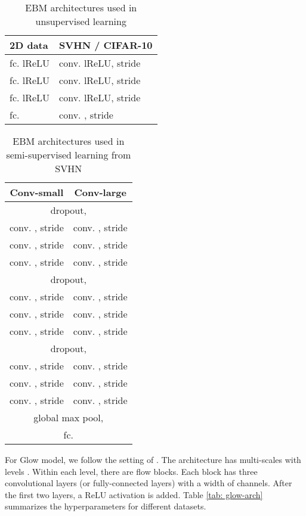 \documentclass[10pt,twocolumn,letterpaper]{article}
\begin{document}
\begin{table}[h]
	\centering
	\caption{EBM architectures used in unsupervised learning}
	\label{tab: ebm-arch}
	\begin{tabular}{ll}
		\toprule
		2D data & SVHN / CIFAR-10  \\
		\midrule 
		fc.  lReLU &  conv.  lReLU, stride   \\
		fc.  lReLU &  conv.  lReLU, stride \\
		fc.  lReLU &  conv.  lReLU, stride \\
		fc.  &  conv. , stride  \\
		\bottomrule
	\end{tabular}
\end{table}

\begin{table}[h]
	\centering
	\caption{EBM architectures used in semi-supervised learning from SVHN}
	\label{tab: ebm-semi-arch}
	\begin{tabular}{cc}
		\toprule
		Conv-small & Conv-large  \\
		\midrule 
		\multicolumn{2}{c}{dropout, }\\
		\midrule
		 conv. , stride  &  conv. , stride   \\
		 conv. , stride  &  conv. , stride   \\
		 conv. , stride  &  conv. , stride   \\
		\midrule
		\multicolumn{2}{c}{dropout, }\\
		\midrule
		 conv. , stride  &  conv. , stride   \\
		 conv. , stride  &  conv. , stride   \\
		 conv. , stride  &  conv. , stride   \\
		\midrule
		\multicolumn{2}{c}{dropout, }\\
		\midrule
		 conv. , stride  &  conv. , stride   \\
		 conv. , stride  &  conv. , stride   \\
		 conv. , stride  &  conv. , stride   \\
		\midrule
		\multicolumn{2}{c}{global max pool, }\\
		\multicolumn{2}{c}{fc. }\\
		\bottomrule
	\end{tabular}
\end{table}

For Glow model, we follow the setting of \cite{kingma2018Glow}. The architecture has multi-scales with levels . Within each level, there are  flow blocks. Each block has three convolutional layers (or fully-connected layers) with a width of  channels. After the first two layers, a ReLU activation is added. Table \ref{tab: glow-arch} summarizes the hyperparameters for different datasets. 
\end{document}
